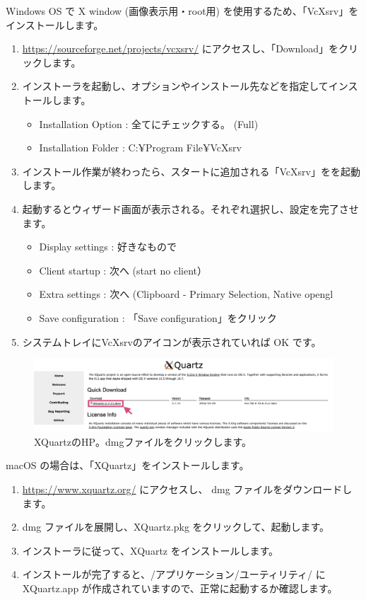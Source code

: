 \documentclass[10pt]{ujarticle}
\begin{document}
Windows OS で X window (画像表示用・root用) を使用するため、「VcXsrv」をインストールします。
\begin{enumerate}
\item \url{https://sourceforge.net/projects/vcxsrv/} にアクセスし、「Download」をクリックします。
\item インストーラを起動し、オプションやインストール先などを指定してインストールします。
\begin{itemize}
\item Installation Option : 全てにチェックする。 (Full)
\item Installation Folder : C:¥Program File¥VcXsrv
\end{itemize}
\item インストール作業が終わったら、スタートに追加される「VcXsrv」をを起動します。
\item 起動するとウィザード画面が表示される。それぞれ選択し、設定を完了させます。
\begin{itemize}
\item Display settings : 好きなもので
\item Client startup : 次へ (start no client）
\item Extra settings : 次へ (Clipboard - Primary Selection, Native opengl
\item Save configuration : 「Save configuration」をクリック
\end{itemize}
\item システムトレイにVcXsrvのアイコンが表示されていれば OK です。
\end{enumerate}
\begin{figure}[h]
\begin{center}
\includegraphics[width=14cm]{XQuartz.png}
\caption{XQuartzのHP。dmgファイルをクリックします。}
\end{center}
\end{figure}
macOS の場合は、「XQuartz」をインストールします。
\begin{enumerate}
\item \url{https://www.xquartz.org/} にアクセスし、 dmg ファイルをダウンロードします。
\item dmg ファイルを展開し、XQuartz.pkg をクリックして、起動します。
\item インストーラに従って、XQuartz をインストールします。
\item インストールが完了すると、/アプリケーション/ユーティリティ/ に XQuartz.app が作成されていますので、正常に起動するか確認します。
\end{enumerate}
\end{document}
